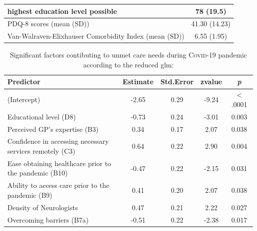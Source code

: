 \documentclass{bmcart}
\begin{document}
\begin{backmatter}
\begin{table}[!ht]
\begin{tabular}{p{5cm} c}
\hspace{3mm} highest education level possible & 78 (19.5)  \\ \hline
\hspace{3mm} PDQ-8 scores (mean (SD)) & 41.30 (14.23) \\ \hline
Van-Walraven-Elixhauser \newline \hspace{3mm} Comorbidity Index (mean (SD)) & 6.55 (1.95) \\ 
\bottomrule
\end{tabular}
\end{table}

\begin{table}[!ht]
\caption{Significant factors contibuting to unmet care needs during \textsc{Covid}-19 pandemic according to the reduced \ac{glm}:}
\label{tab2:reduced_model}
\centering
\begin{tabular}{l c c c c}
\toprule    
Predictor 												& Estimate 	& Std.Error & zvalue & \textit{p} \\
\midrule
(Intercept) 											& -2.65  		& 0.29 	& -9.24 	& $<$.0001 \\ \hline
Educational level (D8) 									& -0.73 		& 0.24 	& -3.01 	& 0.003 \\ \hline
Perceived GP's expertise (B3) 							& 0.34 		& 0.17 	& 2.07 	& 0.038 \\ \hline
Confidence in accessing necessary services remotely (C3) 	& 0.64 		& 0.22 	& 2.90 	& 0.004 \\ \hline
Ease obtaining healthcare prior to the pandemic (B10)		& -0.47 		& 0.22 	& -2.15 	& 0.031 \\ \hline
Ability to access care prior to the pandemic (B9)				& 0.41 		& 0.20 	& 2.07 	& 0.038 \\ \hline
Density of Neurologists 									& 0.47 		& 0.21 	& 2.22 	& 0.027 \\ \hline
Overcoming barriers (B7a)   								& -0.51 		& 0.22 	& -2.38 	& 0.017 \\
\bottomrule
\end{tabular}
\end{table}	




\end{backmatter}
\end{document}
